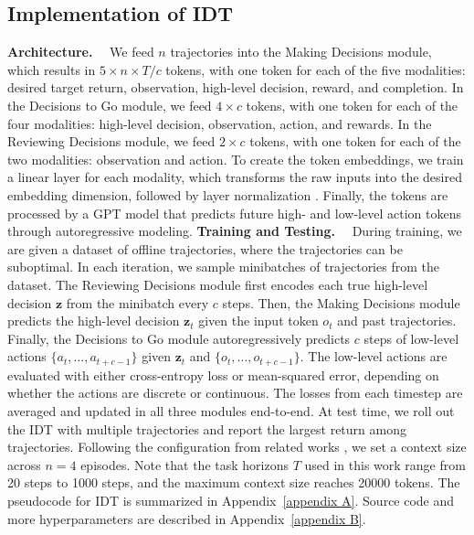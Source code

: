 \documentclass{article}
\theoremstyle{plain}
\theoremstyle{definition}
\theoremstyle{remark}
\begin{document}
\subsection{Implementation of IDT}
\noindent\textbf{Architecture.}~~
We feed $n$ trajectories into the Making Decisions module, which results in $5\times n\times T/c$ tokens, with one token for each of the five modalities: desired target return, observation, high-level decision, reward, and completion. In the Decisions to Go module, we feed $4\times c$ tokens, with one token for each of the four modalities: high-level decision, observation, action, and rewards. In the Reviewing Decisions module, we feed $2\times c$ tokens, with one token for each of the two modalities: observation and action. To create the token embeddings, we train a linear layer for each modality, which transforms the raw inputs into the desired embedding dimension, followed by layer normalization \cite{26}. Finally, the tokens are processed by a GPT model that predicts future high- and low-level action tokens through autoregressive modeling.
\noindent\textbf{Training and Testing.}~~
During training, we are given a dataset of offline trajectories, where the trajectories can be suboptimal.
In each iteration, we sample minibatches of trajectories from the dataset.
The Reviewing Decisions module first encodes each true high-level decision $\textbf{z}$ from the minibatch every $c$ steps.
Then, the Making Decisions module predicts the high-level decision $\textbf{z}_t$ given the input token $o_t$ and past trajectories. Finally, the Decisions to Go module autoregressively predicts $c$ steps of low-level actions $\{a_t,\dots,a_{t+c-1}\}$ given $\textbf{z}_t$ and $\{o_t,\dots,o_{t+c-1}\}$. The low-level actions are evaluated with either cross-entropy loss or mean-squared error, depending on whether the actions are discrete or continuous. The losses from each timestep are averaged and updated in all three modules end-to-end. At test time, we roll out the IDT with multiple trajectories and report the largest return among trajectories. Following the configuration from related works \citet{1,8}, we set a context size across $n=4$ episodes.
Note that the task horizons $T$ used in this work range from 20 steps to 1000 steps, and the maximum context size reaches 20000 tokens.
The pseudocode for IDT is summarized in Appendix~\ref{appendix A}. Source code and more hyperparameters are described in Appendix~\ref{appendix B}.
\end{document}
